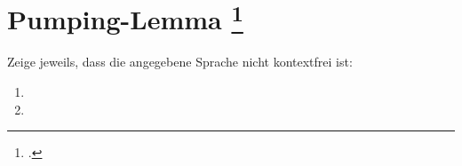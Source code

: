 \documentclass{lehramt-informatik-aufgabe}
\begin{document}
\section{Pumping-Lemma
\footcite{theo:ab:2}}

Zeige jeweils, dass die angegebene Sprache nicht kontextfrei ist:
\begin{enumerate}


\item {}


\item {}

\end{enumerate}
\end{document}
